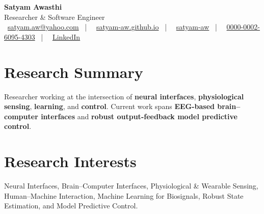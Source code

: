 \documentclass[10pt,letterpaper]{article}
\begin{document}

\begin{center}

    {\LARGE\bfseries\color{primary} Satyam Awasthi} \\ \vspace{0.3em}
    {\color{secondary} Researcher \& Software Engineer} \\ \vspace{0.4em}
    \small 
    \faEnvelope~\href{mailto:satyam.aw@yahoo.com}{satyam.aw@yahoo.com} \ | \ 
    \faGlobe~\href{https://satyam-aw.github.io}{satyam-aw.github.io} \ | \ 
    \faGithub~\href{https://github.com/satyam-aw}{satyam-aw} \ | \ 
    \faOrcid~\href{https://orcid.org/0000-0002-6095-4303}{0000-0002-6095-4303} \ | \ 
    \faLinkedin~\href{https://linkedin.com/in/satyam-awasthi}{LinkedIn}  
\end{center}

\vspace{0.35em}


\section*{Research Summary}

Researcher working at the intersection of \textbf{neural interfaces}, \textbf{physiological sensing}, \textbf{learning}, and \textbf{control}. Current work spans \textbf{EEG-based brain--computer interfaces} and \textbf{robust output-feedback model predictive control}.


\section*{Research Interests}

Neural Interfaces,
Brain--Computer Interfaces,
Physiological \& Wearable Sensing,
Human--Machine Interaction,
Machine Learning for Biosignals,
Robust State Estimation,
and Model Predictive Control.

\end{document}
